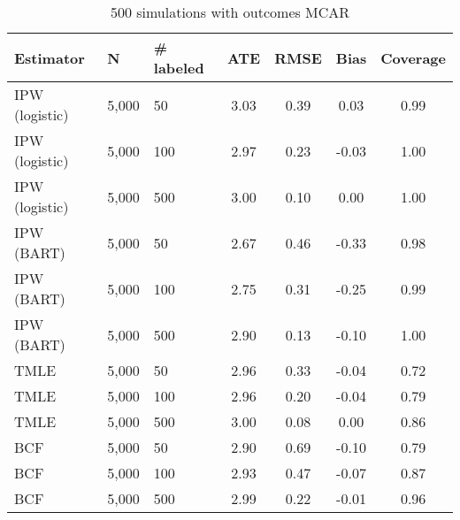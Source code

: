 \begin{table}[ht]
\centering
\begingroup\small
\begin{tabular}{lllcc>{\columncolor[gray]{.9}}c>{\columncolor[gray]{.9}}c}
  \hline
Estimator & N & \# labeled & ATE & RMSE & Bias & Coverage \\ 
  \hline
  IPW (logistic) & 5,000 &  50 & 3.03 & 0.39 & 0.03 & 0.99 \\ 
  IPW (logistic) & 5,000 & 100 & 2.97 & 0.23 & -0.03 & 1.00 \\ 
IPW (logistic) & 5,000 & 500 & 3.00 & 0.10 & 0.00 & 1.00 \\ 
  IPW (BART) & 5,000 &  50 & 2.67 & 0.46 & -0.33 & 0.98 \\ 
  IPW (BART) & 5,000 & 100 & 2.75 & 0.31 & -0.25 & 0.99 \\ 
  IPW (BART) & 5,000 & 500 & 2.90 & 0.13 & -0.10 & 1.00 \\ 
  TMLE & 5,000 &  50 & 2.96 & 0.33 & -0.04 & 0.72 \\ 
  TMLE & 5,000 & 100 & 2.96 & 0.20 & -0.04 & 0.79 \\ 
  TMLE & 5,000 & 500 & 3.00 & 0.08 & 0.00 & 0.86 \\ 
  BCF & 5,000 &  50 & 2.90 & 0.69 & -0.10 & 0.79 \\ 
  BCF & 5,000 & 100 & 2.93 & 0.47 & -0.07 & 0.87 \\ 
  BCF & 5,000 & 500 & 2.99 & 0.22 & -0.01 & 0.96 \\ 
   \hline
\end{tabular}
\endgroup
\caption{500 simulations with outcomes MCAR} 
\end{table}
